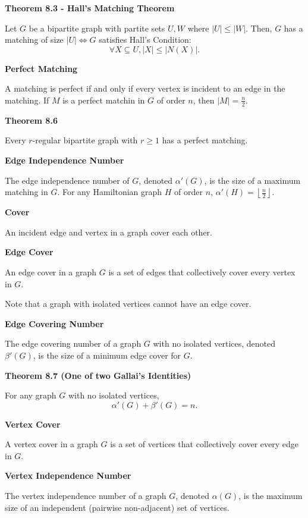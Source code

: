 \documentclass{article}
\begin{document}
\medskip\noindent\textbf{Theorem 8.3 - Hall's Matching Theorem}

	Let $G$ be a bipartite graph with partite sets $U,W$ where $|U| \leq |W|$.
	Then, $G$ has a matching of size $|U| \iff G$ satisfies Hall's Condition: $$\forall X \subseteq U, |X| \leq |N(X)|.$$

\medskip\noindent\textbf{Perfect Matching}

	A matching is perfect if and only if every vertex is incident to an edge in the matching. If $M$ is a perfect matchin in $G$ of order $n$, then $|M| = \frac n2$.

\medskip\noindent\textbf{Theorem 8.6}

	Every $r$-regular bipartite graph with $r \geq 1$ has a perfect matching.

\medskip\noindent\textbf{Edge Independence Number}

	The edge independence number of $G$, denoted $\alpha'(G)$, is the size of a maximum matching in $G$.
	For any Hamiltonian graph $H$ of order $n$, $\alpha'(H) = \left\lfloor \frac n2 \right\rfloor$.

\medskip\noindent\textbf{Cover}

	An incident edge and vertex in a graph cover each other.

\medskip\noindent\textbf{Edge Cover}

	An edge cover in a graph $G$ is a set of edges that collectively cover every vertex in $G$.

	Note that a graph with isolated vertices cannot have an edge cover.

\medskip\noindent\textbf{Edge Covering Number}

	The edge covering number of a graph $G$ with no isolated vertices, denoted $\beta'(G)$, is the size of a minimum edge cover for $G$.

\medskip\noindent\textbf{Theorem 8.7 (One of two Gallai's Identities)}

	For any graph $G$ with no isolated vertices, $$\alpha'(G) + \beta'(G) = n.$$

\medskip\noindent\textbf{Vertex Cover}

	A vertex cover in a graph $G$ is a set of vertices that collectively cover every edge in $G$.

\medskip\noindent\textbf{Vertex Independence Number}

	The vertex independence number of a graph $G$, denoted $\alpha(G)$, is the maximum size of an independent (pairwise non-adjacent) set of vertices.
\end{document}
